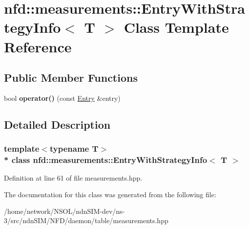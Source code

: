 \hypertarget{classnfd_1_1measurements_1_1EntryWithStrategyInfo}{}\section{nfd\+:\+:measurements\+:\+:Entry\+With\+Strategy\+Info$<$ T $>$ Class Template Reference}
\label{classnfd_1_1measurements_1_1EntryWithStrategyInfo}
\subsection*{Public Member Functions}
\begin{DoxyCompactItemize}
\item 
bool {\bfseries operator()} (const \hyperlink{classnfd_1_1measurements_1_1Entry}{Entry} \&entry)\hypertarget{classnfd_1_1measurements_1_1EntryWithStrategyInfo_abeb5ead80c7c182e8bf10b1507bca061}{}\label{classnfd_1_1measurements_1_1EntryWithStrategyInfo_abeb5ead80c7c182e8bf10b1507bca061}

\end{DoxyCompactItemize}


\subsection{Detailed Description}
\subsubsection*{template$<$typename T$>$\\*
class nfd\+::measurements\+::\+Entry\+With\+Strategy\+Info$<$ T $>$}



Definition at line 61 of file measurements.\+hpp.



The documentation for this class was generated from the following file\+:\begin{DoxyCompactItemize}
\item 
/home/network/\+N\+S\+O\+L/ndn\+S\+I\+M-\/dev/ns-\/3/src/ndn\+S\+I\+M/\+N\+F\+D/daemon/table/measurements.\+hpp\end{DoxyCompactItemize}
